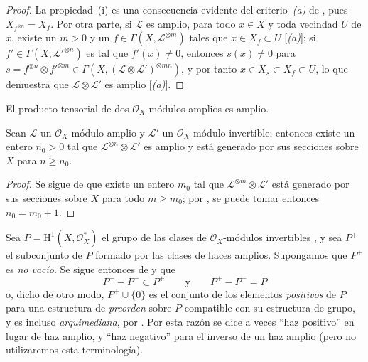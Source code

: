 \documentclass[oneside,10pt]{amsart}
\renewcommand{\geq}{\geqslant}
\let\EGAOriginalLabel\label
\renewcommand{\label}[1]{\phantomsection\EGAOriginalLabel{#1}}
\begin{document}
\begin{proof}
La propiedad~(i) es una consecuencia evidente del criterio~\emph{(a)} de , pues $X_{f^{\otimes n}}=X_f$.
Por otra parte, si $\mathcal{L}$ es amplio, para todo $x\in X$ y toda vecindad $U$ de $x$, existe un $m>0$ y un $f\in\Gamma(X,\mathcal{L}^{\otimes m})$ tales que $x\in X_f\subset U$ [\emph{(a)}];
si $f'\in\Gamma(X,\mathcal{L}'^{\otimes n})$ es tal que $f'(x)\neq0$, entonces $s(x)\neq0$ para $s=f^{\otimes n}\otimes f'^{\otimes m}\in
\Gamma(X,(\mathcal{L}\otimes\mathcal{L}')^{\otimes mn})$, y por tanto $x\in X_s\subset X_f\subset U$, lo que demuestra que $\mathcal{L}\otimes\mathcal{L}'$ es amplio [\emph{(a)}].
\end{proof}

\begin{corollary}[4.5.7]
\label{II.4.5.7-fr}
El producto tensorial de dos $\mathcal{O}_X$-módulos amplios es amplio.
\end{corollary}

\begin{corollary}[4.5.8]
\label{II.4.5.8-fr}
Sean $\mathcal{L}$ un $\mathcal{O}_X$-módulo amplio y $\mathcal{L}'$ un $\mathcal{O}_X$-módulo invertible;
entonces existe un entero $n_0>0$ tal que $\mathcal{L}^{\otimes n}\otimes\mathcal{L}'$ es amplio y está generado por sus secciones sobre $X$ para $n\geq n_0$.
\end{corollary}

\begin{proof}
Se sigue de  que existe un entero $m_0$ tal que $\mathcal{L}^{\otimes m}\otimes\mathcal{L}'$ está generado por sus secciones sobre $X$ para todo $m\geq m_0$;
por , se puede tomar entonces $n_0=m_0+1$.
\end{proof}

\begin{remark}[4.5.9]
\label{II.4.5.9-fr}
Sea $P=\mathrm{H}^1(X,\mathcal{O}_X^*)$ el grupo de las clases de $\mathcal{O}_X$-módulos invertibles , y sea $P^+$ el subconjunto de $P$ formado por las clases de haces amplios.
Supongamos que $P^+$ es \emph{no vacío}.
Se sigue entonces de  y  que
\[
  P^++P^+\subset P^+
  \qquad\text{y}\qquad
  P^+-P^+=P
\]
o, dicho de otro modo, $P^+\cup\{0\}$ es el conjunto de los elementos \emph{positivos} de $P$ para una estructura de \emph{preorden} sobre $P$ compatible con su estructura de grupo, y es incluso \emph{arquimediana}, por .
Por esta razón se dice a veces ``haz positivo'' en lugar de haz amplio, y ``haz negativo'' para el inverso de un haz amplio (pero no utilizaremos esta terminología).
\end{remark}
\end{document}
